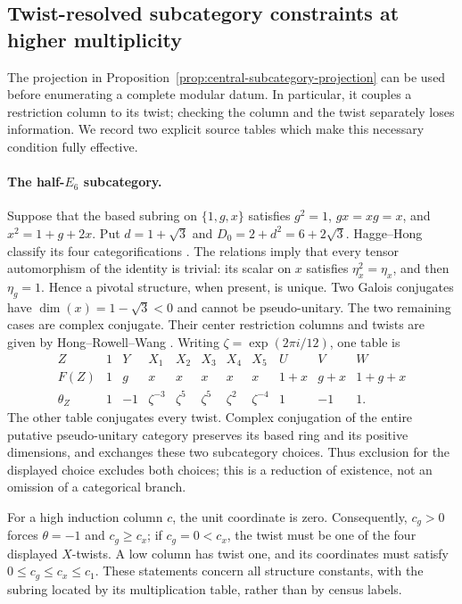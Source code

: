 \subsection{Twist-resolved subcategory constraints at higher multiplicity}
\label{subsec:round4-higher}

The projection in Proposition~\ref{prop:central-subcategory-projection}
can be used before enumerating a complete modular datum.  In particular,
it couples a restriction column to its twist; checking the column and the
twist separately loses information.  We record two explicit source tables
which make this necessary condition fully effective.

\paragraph{The half-$E_6$ subcategory.}
Suppose that the based subring on $\{1,g,x\}$ satisfies
$g^2=1$, $gx=xg=x$, and $x^2=1+g+2x$.
Put $d=1+\sqrt3$ and $D_0=2+d^2=6+2\sqrt3$.
Hagge--Hong classify its four categorifications
\cite[Theorem~1 and Sections~4.7--4.8]{HH3}.
The relations imply that every tensor automorphism of the identity is
trivial: its scalar on $x$ satisfies $\eta_x^2=\eta_x$, and then
$\eta_g=1$.  Hence a pivotal structure, when present, is unique.
Two Galois conjugates have $\dim(x)=1-\sqrt3<0$ and cannot be
pseudo-unitary.  The two remaining cases are complex conjugate.
Their center restriction columns and twists are given by
Hong--Rowell--Wang \cite[Section~2.1]{HRWexotic}.  Writing $\zeta=\exp(2\pi i/12)$, one table is
\begingroup\setlength{\arraycolsep}{3pt}
\[
\begin{array}{c|cccccccccc}
Z&1&Y&X_1&X_2&X_3&X_4&X_5&U&V&W\\ \hline
F(Z)&1&g&x&x&x&x&x&1+x&g+x&1+g+x\\
\theta_Z&1&-1&\zeta^{-3}&\zeta^5&\zeta^5&\zeta^2&\zeta^{-4}&1&-1&1.
\end{array}
\]
\endgroup
The other table conjugates every twist.  Complex conjugation of the entire
putative pseudo-unitary category preserves its based ring and its positive
dimensions, and exchanges these two subcategory choices.  Thus exclusion
for the displayed choice excludes both choices; this is a reduction of
existence, not an omission of a categorical branch.

For a high induction column $c$, the unit coordinate is zero.
Consequently, $c_g>0$ forces $\theta=-1$ and $c_g\ge c_x$;
if $c_g=0<c_x$, the twist must be one of the four displayed $X$-twists.
A low column has twist one, and its coordinates must satisfy
$0\le c_g\le c_x\le c_1$.
These statements concern all structure constants, with the subring
located by its multiplication table, rather than by census labels.

